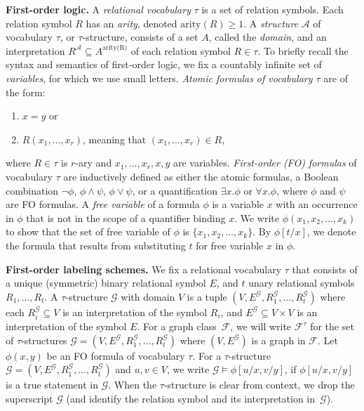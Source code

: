 \documentclass{article}
\newcommand{\cF}{\ensuremath{\mathcal{F}}}
\newcommand{\cG}{\ensuremath{\mathcal{G}}}
\begin{document}
\medskip
\noindent
\textbf{First-order logic.}
A \textit{relational vocabulary} $\tau$ is a set of relation symbols. Each relation symbol $R$ 
has an \textit{arity}, denoted $\text{arity}(R) \geq 1$. A \textit{structure} $\mathcal{A}$ 
of vocabulary $\tau$, or $\tau$-structure,  consists of a set $A$, called the \textit{domain}, and an interpretation
$R^{\mathcal{A}} \subseteq A^{\text{arity(R)}}$ of each relation symbol $R \in \tau$.
To briefly recall the syntax and semantics of first-order logic, we fix a countably
infinite set of \textit{variables}, for which we use small letters. 
\textit{Atomic formulas of vocabulary $\tau$} are of the form:
\begin{enumerate} 
	\item $x = y$ or
	\item $R(x_1, \ldots, x_r)$, meaning that $(x_1, \ldots, x_r) \in R$,
\end{enumerate}
where $R \in \tau$ is $r$-ary and $x_1, \ldots , x_r, x, y$ are variables.
\textit{First-order (FO) formulas} of vocabulary $\tau$ are inductively defined as either the atomic formulas,
a Boolean combination $\neg\phi$, $\phi\wedge\psi$, $\phi\vee\psi$, or a quantification $\exists
x.\phi$ or $\forall x.\phi$, where $\phi$ and $\psi$ are FO formulas.
%
A \textit{free variable} of a formula $\phi$ is a variable $x$ with an occurrence in $\phi$ 
that is not in the scope of a quantifier binding $x$. 
We write $\phi(x_1, x_2, \ldots, x_k)$ to show that the set of free variable of $\phi$
is $\{ x_1, x_2, \ldots, x_k \}$.
By $\phi[t/x]$, we denote the formula that results from substituting $t$ for free variable $x$ in $\phi$.


\medskip
\noindent
\textbf{First-order labeling schemes.}
We fix a relational vocabulary $\tau$ that consists of a unique (symmetric) binary relational symbol
$E$, and $t$ unary relational symbols $R_1, \dotsc, R_t$. A $\tau$-structure $\cG$ with
domain $V$ is a tuple $(V, E^\cG, R_1^\cG, \dotsc, R_t^\cG)$ where each $R_i^\cG \subseteq V$ is an
interpretation of the symbol $R_i$, and $E^\cG \subseteq V \times V$ is an interpretation of the symbol
$E$. 
For a graph class~$\cF$, we will write $\cF^\tau$ for the set of $\tau$-structures $\cG = (V, E^\cG,
R_1^\cG, \dotsc, R_t^\cG)$ where $(V,E^\cG)$ is a graph in $\cF$. Let $\phi(x,y)$ be an FO formula of
vocabulary $\tau$. For a $\tau$-structure $\cG = (V,E^\cG,R_1^\cG,\dotsc,R_t^\cG)$ and $u,v \in V$, we write $\cG \models \phi[u/x,v/y]$, if $\phi[u/x,v/y]$ is a true statement in $\cG$.
When the $\tau$-structure is clear from context, we drop the superscript $\cG$ (and identify the relation symbol and its interpretation in~$\cG$).
\end{document}
